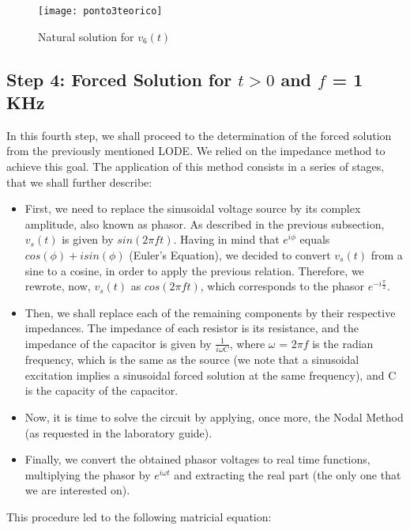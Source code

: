 \FloatBarrier
\begin{figure}[h] \centering
	\texttt{[image: ponto3teorico]}
	\caption{Natural solution for $v_6(t)$}
	\label{fig:ponto3teorico}
\end{figure}
\FloatBarrier
\subsection{Step 4: Forced Solution for $t > 0$ and $f$ = 1 KHz}

In this fourth step, we shall proceed to the determination of the forced solution from the previously mentioned LODE. We relied on the impedance method to achieve this goal. The application of this method consists in a series of stages, that we shall further describe:
\begin{itemize}
	\item First, we need to replace the sinusoidal voltage source by its complex amplitude, also known as phasor. As described in the previous subsection, $v_s(t)$ is given by $sin(2\pi ft)$. Having in mind that $e^{i\phi}$ equals $cos(\phi) + i sin(\phi)$ (Euler's Equation), we decided to convert $v_s(t)$ from a sine to a cosine, in order to apply the previous relation. Therefore, we rewrote, now, $v_s(t)$ as $cos(2\pi ft)$, which corresponds to the phasor $e^{-i\frac{\pi}{2}}$.
	\item Then, we shall replace each of the remaining components by their respective impedances. The impedance of each resistor is its resistance, and the impedance of the capacitor is given by $\frac{1}{i\omega C}$, where $\omega$ = $2\pi f$ is the radian frequency, which is the same as the source (we note that a sinusoidal excitation implies a sinusoidal forced solution at the same frequency), and C is the capacity of the capacitor.
	\item Now, it is time to solve the circuit by applying, once more, the Nodal Method (as requested in the laboratory guide).
	\item Finally, we convert the obtained phasor voltages to real time functions, multiplying the phasor by $e^{i\omega t}$ and extracting the real part (the only one that we are interested on).
\end{itemize}

This procedure led to the following matricial equation:

